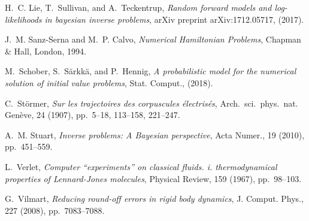 \documentclass[10pt]{article}
\begin{document}
\begin{thebibliography}{10}
	{\sc H.~C. Lie, T.~Sullivan, and A.~Teckentrup}, {\em Random forward models and
		log-likelihoods in bayesian inverse problems}, arXiv preprint
	arXiv:1712.05717,  (2017).
	
	{\sc J.~M. Sanz-Serna and M.~P. Calvo}, {\em Numerical {H}amiltonian
		{P}roblems}, Chapman \& Hall, London, 1994.
	
	{\sc M.~Schober, S.~S{\"a}rkk{\"a}, and P.~Hennig}, {\em A probabilistic model
		for the numerical solution of initial value problems}, Stat. Comput.,
	(2018).
	
	{\sc C.~St\"ormer}, {\em Sur les trajectoires des corpuscules \'electris\'es},
	Arch.\ sci.\ phys.\ nat. Gen\`eve, 24 (1907), pp.~5--18, 113--158, 221--247.
	
	{\sc A.~M. Stuart}, {\em Inverse problems: A {B}ayesian perspective}, Acta
	Numer., 19 (2010), pp.~451--559.
	
	{\sc L.~Verlet}, {\em Computer ``experiments'' on classical fluids. i.
		thermodynamical properties of {L}ennard-{J}ones molecules}, Physical Review,
	159 (1967), pp.~98--103.
	
	{\sc G.~Vilmart}, {\em Reducing round-off errors in rigid body dynamics}, J.
	Comput. Phys., 227 (2008), pp.~7083--7088.
	
\end{thebibliography}
\end{document}
